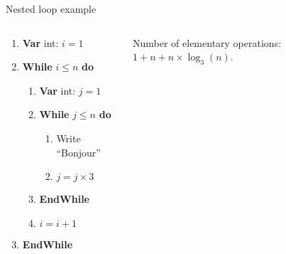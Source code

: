 \documentclass[english,10pt,table]{beamer}
\begin{document}
\begin{frame}{Nested loop example}
   \only<1->{
			\begin{block}{}\small			
     \textcolor{blue}{Nb of iterations = nb of iterations of external loop $\times$ nb of iterations of internal loop}
			\end{block}
			}
			\pause
			\begin{columns}
  \begin{column}{0.48\textwidth}			
    \begin{block}{}\small				
			\begin{enumerate}[1.]\small				
		   \item \textbf{Var} int: \alert{$i=1$}
     \item \textbf{While} \alert{$i \leq n$} \textbf{do}
					 \begin{enumerate}[1.]\small				
       \item \textbf{Var} int: \alert{$j=1$}
							\item \textbf{While} \alert{$j \leq n$} \textbf{do}
					   \begin{enumerate}[1.]\small				
         \item Write ``Bonjour'' 
									\item \alert{$j = j \times 3$}
							 \end{enumerate}
					  \item \textbf{EndWhile}
							\item \alert{$i = i + 1$}
						\end{enumerate}
					\item \textbf{EndWhile}
			\end{enumerate}
   \end{block}
		 \end{column}
			\pause
   \begin{column}{0.48\textwidth}
		\begin{block}{}
		 Number of elementary operations: \alert{$1+ n + n \times \log_3 (n)$}.
	 \end{block}	
  \end{column}
  \end{columns}
\end{frame}
\end{document}
